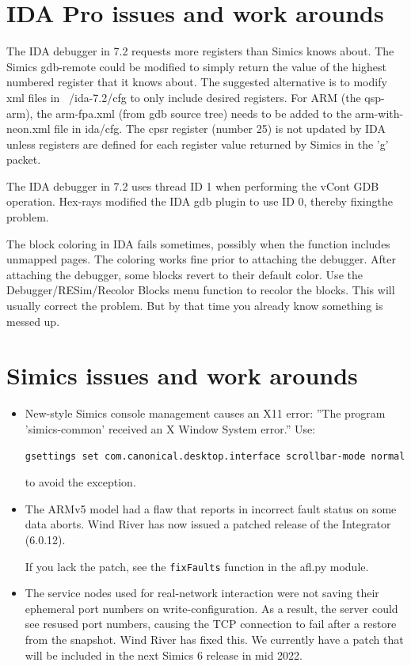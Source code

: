 \documentclass[titlepage]{article}
\begin{document}
\begin{appendices}
\section{IDA Pro issues and work arounds}
The IDA debugger in 7.2 requests more registers than Simics knows about.  The Simics gdb-remote could be modified
to simply return the value of the highest numbered register that it knows about.  The suggested alternative is to modify
xml files in ~/ida-7.2/cfg to only include desired registers.   For ARM (the qsp-arm), the arm-fpa.xml (from gdb source
tree) needs to be added to the arm-with-neon.xml file in ida/cfg.  The cpsr register (number 25) is not updated by IDA
unless registers are defined for each register value returned by Simics in the 'g' packet.

The IDA debugger in 7.2 uses thread ID 1 when performing the vCont GDB operation.  Hex-rays modified the IDA gdb plugin to
use ID 0, thereby fixingthe problem.

The block coloring in IDA fails sometimes, possibly when the function includes unmapped pages.  The coloring works fine prior
to attaching the debugger.  After attaching the debugger, some blocks revert to their default color.  Use the Debugger/RESim/Recolor Blocks
menu function to recolor the blocks. 
This will usually correct the problem.  But by that time you already know something is messed up.

\section{Simics issues and work arounds}
\begin{itemize}
\item New-style Simics console management causes an X11 error: ''The program 'simics-common' received an X Window System error.''
Use:
\begin{verbatim}
gsettings set com.canonical.desktop.interface scrollbar-mode normal
\end{verbatim}
\noindent to avoid the exception.
\item The ARMv5 model had a flaw that reports in incorrect fault status on some data aborts.  Wind River has now issued a patched release
of the Integrator (6.0.12).

If you lack the patch, see the {\tt fixFaults} function in the afl.py module.

\item The service nodes used for real-network interaction were not saving their ephemeral port numbers on write-configuration.  As a result,
the server could see resused port numbers, causing the TCP connection to fail after a restore from the snapshot.  Wind River has fixed this.
We currently have a patch that will be included in the next Simics 6 release in mid 2022.
\end{itemize}


\end{appendices}
\end{document}
